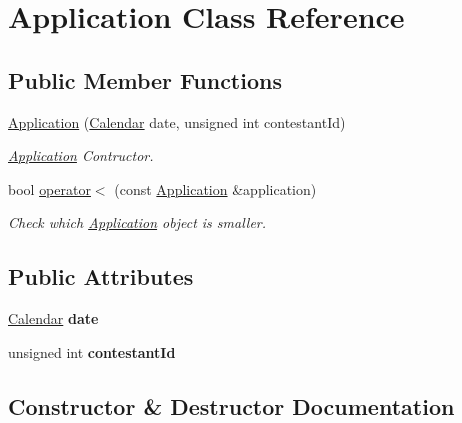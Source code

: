 \hypertarget{class_application}{}\section{Application Class Reference}
\label{class_application}
\subsection*{Public Member Functions}
\begin{DoxyCompactItemize}
\item 
\hyperlink{class_application_a562a062d2e3b12ce07550aa54c6cc4f2}{Application} (\hyperlink{class_calendar}{Calendar} date, unsigned int contestant\+Id)
\begin{DoxyCompactList}\small\item\em \hyperlink{class_application}{Application} Contructor. \end{DoxyCompactList}\item 
bool \hyperlink{class_application_a9ac9bea7fda70aa30204d1b4f7deb4ea}{operator$<$} (const \hyperlink{class_application}{Application} \&application)
\begin{DoxyCompactList}\small\item\em Check which \hyperlink{class_application}{Application} object is smaller. \end{DoxyCompactList}\end{DoxyCompactItemize}
\subsection*{Public Attributes}
\begin{DoxyCompactItemize}
\item 
\mbox{\label{class_application_a05ebdad4ea8368718d1f3745cd403ac2}} 
\hyperlink{class_calendar}{Calendar} {\bfseries date}
\item 
\mbox{\label{class_application_a61861f05d88ac75940faf5c1f02298cf}} 
unsigned int {\bfseries contestant\+Id}
\end{DoxyCompactItemize}


\subsection{Constructor \& Destructor Documentation}
\mbox{\label{class_application_a562a062d2e3b12ce07550aa54c6cc4f2}} 

